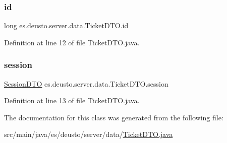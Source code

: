 \subsubsection{\texorpdfstring{id}{id}}
{\footnotesize\ttfamily long es.\+deusto.\+server.\+data.\+Ticket\+D\+T\+O.\+id}



Definition at line 12 of file Ticket\+D\+T\+O.\+java.

\mbox{\label{classes_1_1deusto_1_1server_1_1data_1_1_ticket_d_t_o_a9d76a5dad7b29b3ea22f11df64f75483}} 
\subsubsection{\texorpdfstring{session}{session}}
{\footnotesize\ttfamily \mbox{\hyperlink{classes_1_1deusto_1_1server_1_1data_1_1_session_d_t_o}{Session\+D\+TO}} es.\+deusto.\+server.\+data.\+Ticket\+D\+T\+O.\+session}



Definition at line 13 of file Ticket\+D\+T\+O.\+java.



The documentation for this class was generated from the following file\+:\begin{DoxyCompactItemize}
\item 
src/main/java/es/deusto/server/data/\mbox{\hyperlink{_ticket_d_t_o_8java}{Ticket\+D\+T\+O.\+java}}\end{DoxyCompactItemize}

